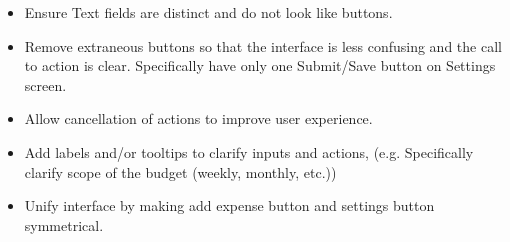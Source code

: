\documentclass{chi2011}
\begin{document}
    \begin{itemize}
        \item Ensure Text fields are distinct and do not look like buttons.
        \item Remove extraneous buttons so that the interface is less confusing and the call to action is clear.
            Specifically have only one Submit/Save button on Settings screen.
        \item Allow cancellation of actions to improve user experience.
        \item Add labels and/or tooltips to clarify inputs and actions, (e.g. Specifically clarify scope of the budget
            (weekly, monthly, etc.))
        \item Unify interface by making add expense button and settings button symmetrical.
    \end{itemize}
\end{document}
